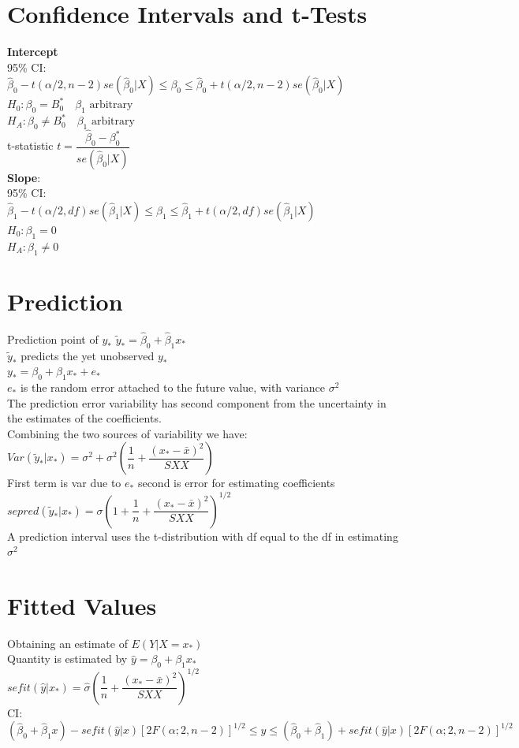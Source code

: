 \documentclass[openany]{book}
\newcommand{\B}{\beta}
\newcommand{\sg}{\sigma}
\newcommand{\hb}{\hat{\beta}}
\numberwithin{equation}{section}
\begin{document}
\begin{flushleft}
\section{Confidence Intervals and t-Tests}
\textbf{Intercept}\\
95\% CI:\\
$\hb_0-t(\alpha/2,n-2)se(\hb_0|X)\leq \B_0\leq \hb_0+t(\alpha/2,n-2)se(\hb_0|X)$\\
$H_0:\B_0=B_0^{*} \quad \B_1 \text{ arbitrary}$\\
$H_A:\B_0\neq B_0^{*} \quad \B_1 \text{ arbitrary}$\\
t-statistic $t=\dfrac{\hat{\B}_0-\B_0^{*}}{se(\hat{\B}_0|X)}$\\
\textbf{Slope}:\\
95\% CI:\\
$\hb_1-t(\alpha/2,df)se(\hb_1|X)\leq \B_1\leq \hb_1+t(\alpha/2,df)se(\hb_1|X)$\\
$H_0:\B_1=0$\\
$H_A:\B_1\neq 0$\\
\section{Prediction}
Prediction point of $y_*$  $\tilde{y}_{*}=\hat{\B}_0+\hb_1x_*$\\
$\tilde{y}_{*}$ predicts the yet unobserved $y_*$\\
$y_*=\B_0+\B_1x_*+e_*$\\
$e_*$ is the random error attached to the future value, with variance $\sigma^2$\\
The prediction error variability has second component from
the uncertainty in the estimates of the coefficients.\\
Combining the two sources of variability we have:\\
$Var(\tilde{y}_*|x_*)=\sg^2+\sg^2\left(\dfrac{1}{n}+\dfrac{(x_*-\bar{x})^2}{SXX}\right)$\\
First term is var due to $e_*$ second is error for estimating coefficients\\
$sepred(\tilde{y}_*|x_*)=\sg\left(1+\dfrac{1}{n}+\dfrac{(x_*-\bar{x})^2}{SXX}\right)^{1/2}$\\
A prediction interval uses the t-distribution with df equal to
the df in estimating $\sg^2$\\
\section{Fitted Values}
Obtaining an estimate of $E(Y|X=x_*)$\\
Quantity is estimated by $\hat{y}=\B_0+\B_1x_*$\\
$sefit(\hat{y}|x_*)=\hat{\sg}\left(\dfrac{1}{n}+\dfrac{(x_*-\bar{x})^2}{SXX}\right)^{1/2}$\\
CI:\\
$(\hb_0+\hb_1x)-sefit(\hat{y}|x)[2F(\alpha;2,n-2)]^{1/2}\leq y\leq (\hb_0+\hb_1)+sefit(\hat{y}|x)[2F(\alpha;2,n-2)]^{1/2}$\\

\end{flushleft}
\end{document}
